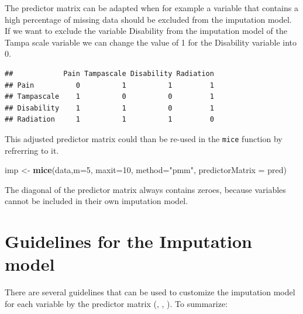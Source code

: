 \documentclass[
]{book}
\newenvironment{Shaded}{\begin{snugshade}}{\end{snugshade}}
\newcommand{\DataTypeTok}[1]{\textcolor[rgb]{0.13,0.29,0.53}{#1}}
\newcommand{\DecValTok}[1]{\textcolor[rgb]{0.00,0.00,0.81}{#1}}
\newcommand{\KeywordTok}[1]{\textcolor[rgb]{0.13,0.29,0.53}{\textbf{#1}}}
\newcommand{\NormalTok}[1]{#1}
\newcommand{\OperatorTok}[1]{\textcolor[rgb]{0.81,0.36,0.00}{\textbf{#1}}}
\newcommand{\StringTok}[1]{\textcolor[rgb]{0.31,0.60,0.02}{#1}}
\begin{document}
The predictor matrix can be adapted when for example a variable that contains a high percentage of missing data should be excluded from the imputation model. If we want to exclude the variable Disability from the imputation model of the Tampa scale variable we can change the value of 1 for the Disability variable into 0.

\begin{Shaded}
\end{Shaded}

\begin{verbatim}
##            Pain Tampascale Disability Radiation
## Pain          0          1          1         1
## Tampascale    1          0          0         1
## Disability    1          1          0         1
## Radiation     1          1          1         0
\end{verbatim}

This adjusted predictor matrix could than be re-used in the \texttt{mice} function by refrerring to it.

\begin{Shaded}
\begin{Highlighting}[]
\NormalTok{imp <-}\StringTok{ }\KeywordTok{mice}\NormalTok{(data,}\DataTypeTok{m=}\DecValTok{5}\NormalTok{, }\DataTypeTok{maxit=}\DecValTok{10}\NormalTok{, }\DataTypeTok{method=}\StringTok{"pmm"}\NormalTok{, }\DataTypeTok{predictorMatrix =}\NormalTok{ pred)}
\end{Highlighting}
\end{Shaded}

The diagonal of the predictor matrix always contains zeroes, because variables cannot be included in their own imputation model.

\hypertarget{guidelines-for-the-imputation-model}{%
\section{Guidelines for the Imputation model}\label{guidelines-for-the-imputation-model}}

There are several guidelines that can be used to customize the imputation model for each variable by the predictor matrix (\citet{Collins2001}, \citet{VanBuuren2018}, \citet{Rubin1976}). To summarize:
\end{document}
